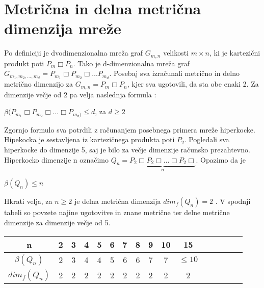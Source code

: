 \documentclass[a4paper]{report}
\begin{document}
	\section*{Metrična in delna metrična dimenzija mreže}
	Po definiciji je dvodimenzionalna mreža graf $G_{m,n}$ velikosti $m\times n$, ki je kartezični produkt poti $P_{m}\Box P_{n}$. Tako je d-dimenzionalna mreža graf $G_{m_{1},m_{2},\dots,m_{d}} = P_{m_{1}}\Box P_{m_{2}}\Box \dots P_{m_{d}}$. Posebaj sva izračunali metrično in delno metrično dimenzijo za  $G_{m,n}=P_{m}\Box P_{n}$, kjer sva ugotovili, da sta obe enaki 2. Za dimenzije večje od 2 pa velja naslednja formula : \\
	\begin{center}
		$\beta(P_{m_{1}}\Box P_{m_{2}}\Box \dots \Box P_{m_{d})} \le d$, za $d\ge 2$
	\end{center}
	Zgornjo formulo sva potrdili z računanjem posebnega primera mreže hiperkocke. Hipekocka je sestavljena iz kartezičnega produkta poti $P_{2}$. Pogledali sva  hiperkocke do dimenzije 5, saj je bilo za večje dimenzije računsko prezahtevno. Hiperkocko dimenzije n označimo $Q_{n} = \underbrace{P_{2} \Box P_{2}\Box \dots \Box P_{2}\Box}_{n}$. Opazimo da je
	\begin{center}
		$\beta(Q_{n})\le n$
	\end{center}
	Hkrati velja, za $n \ge 2$ je delna metrična dimenzija $dim_{f}(Q_{n}) = 2$ . 
	V spodnji tabeli so povzete najine ugotovitve in znane metrične ter delne metrične dimenzije za dimenzije večje od 5.
	
	
	\begin{center}
		\begin{tabular}{|c||c|c|c|c|c|c|c|c|c|c|c|c|c|c|c}
			\hline
			\hline
			n&2&3&4&5&6&7&8&9&10&15\\
			\hline
			$\beta(Q_{n})$&2&3&4&4&5&6&6&7&7& $\le 10$ \\
			\hline
			$dim_{f}(Q_{n})$&2&2&2&2&2&2&2&2&2&2\\
			\hline
			\hline
		\end{tabular}
	\end{center}
	
\end{document}
